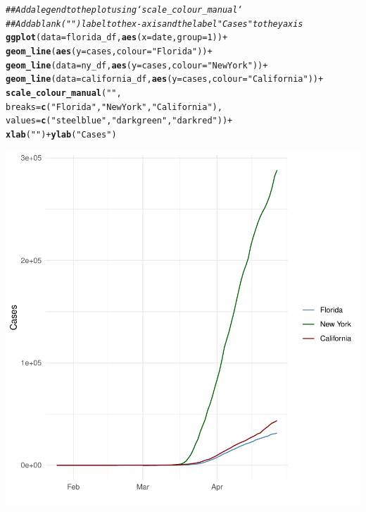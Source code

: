 \documentclass{article}\usepackage[]{graphicx}\usepackage[]{xcolor}
\makeatletter
\newcommand{\hlnum}[1]{\textcolor[rgb]{0.686,0.059,0.569}{#1}}%
\newcommand{\hlstr}[1]{\textcolor[rgb]{0.192,0.494,0.8}{#1}}%
\newcommand{\hlcom}[1]{\textcolor[rgb]{0.678,0.584,0.686}{\textit{#1}}}%
\newcommand{\hlopt}[1]{\textcolor[rgb]{0,0,0}{#1}}%
\newcommand{\hlstd}[1]{\textcolor[rgb]{0.345,0.345,0.345}{#1}}%
\newcommand{\hlkwc}[1]{\textcolor[rgb]{0.333,0.667,0.333}{#1}}%
\newcommand{\hlkwd}[1]{\textcolor[rgb]{0.737,0.353,0.396}{\textbf{#1}}}%
\newenvironment{kframe}{%
 \def\at@end@of@kframe{}%
 \ifinner\ifhmode%
  \def\at@end@of@kframe{\end{minipage}}%
  \begin{minipage}{\columnwidth}%
 \fi\fi%
 \def\FrameCommand##1{\hskip\@totalleftmargin \hskip-\fboxsep
 \colorbox{shadecolor}{##1}\hskip-\fboxsep
     \hskip-\linewidth \hskip-\@totalleftmargin \hskip\columnwidth}%
 \MakeFramed {\advance\hsize-\width
   \@totalleftmargin\z@ \linewidth\hsize
   \@setminipage}}%
 {\par\unskip\endMakeFramed%
 \at@end@of@kframe}
\newenvironment{knitrout}{}{} %
\makeatother
\begin{document}
\begin{knitrout}
{}


\begin{kframe}\begin{alltt}
\hlcom{## Add a legend to the plot using `scale_colour_manual`}
\hlcom{## Add a blank (" ") label to the x-axis and the label "Cases" to the y axis}
\hlkwd{ggplot}\hlstd{(}\hlkwc{data}\hlstd{=florida_df,} \hlkwd{aes}\hlstd{(}\hlkwc{x}\hlstd{=date,} \hlkwc{group}\hlstd{=}\hlnum{1}\hlstd{))} \hlopt{+}
  \hlkwd{geom_line}\hlstd{(}\hlkwd{aes}\hlstd{(}\hlkwc{y} \hlstd{= cases,} \hlkwc{colour} \hlstd{=} \hlstr{"Florida"}\hlstd{))} \hlopt{+}
  \hlkwd{geom_line}\hlstd{(}\hlkwc{data}\hlstd{=ny_df,} \hlkwd{aes}\hlstd{(}\hlkwc{y} \hlstd{= cases,}\hlkwc{colour}\hlstd{=}\hlstr{"New York"}\hlstd{))} \hlopt{+}
  \hlkwd{geom_line}\hlstd{(}\hlkwc{data}\hlstd{=california_df,} \hlkwd{aes}\hlstd{(}\hlkwc{y} \hlstd{= cases,} \hlkwc{colour}\hlstd{=}\hlstr{"California"}\hlstd{))} \hlopt{+}
  \hlkwd{scale_colour_manual}\hlstd{(}\hlstr{""}\hlstd{,}
                      \hlkwc{breaks} \hlstd{=} \hlkwd{c}\hlstd{(}\hlstr{"Florida"}\hlstd{,} \hlstr{"New York"}\hlstd{,} \hlstr{"California"}\hlstd{),}
                      \hlkwc{values} \hlstd{=} \hlkwd{c}\hlstd{(}\hlstr{"steelblue"}\hlstd{,} \hlstr{"darkgreen"}\hlstd{,} \hlstr{"darkred"}\hlstd{))} \hlopt{+}
  \hlkwd{xlab}\hlstd{(}\hlstr{" "}\hlstd{)} \hlopt{+} \hlkwd{ylab}\hlstd{(}\hlstr{"Cases"}\hlstd{)}
\end{alltt}
\end{kframe}

{\centering \includegraphics[width=.6\linewidth]{figure/assignment-06-ReppetoBrian-Rnwauto-report-9} 

}



\end{knitrout}
\end{document}
